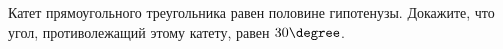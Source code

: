 \begin{ex}
	\begin{condition}
		Катет прямоугольного треугольника равен половине гипотенузы. Докажите, что угол, противолежащий этому катету, равен \( 30\degree \).
	\end{condition}
\end{ex}